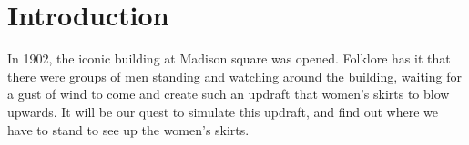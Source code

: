 \section{Introduction}
In 1902, the iconic building at Madison square was opened. Folklore has it that there were groups of men standing and watching around the building, waiting for a gust of wind to come and create such an updraft that women's skirts to blow upwards. It will be our quest to simulate this updraft, and find out where we have to stand to see up the women's skirts. 